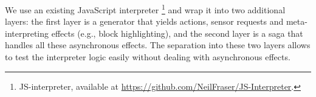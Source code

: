 We use an existing JavaScript interpreter%
\footnote{JS-interpreter, available at \url{https://github.com/NeilFraser/JS-Interpreter}.}
and wrap it into two
additional layers: the first layer is a generator
that yields actions, sensor requests and
meta-interpreting effects (e.g., block highlighting), %
and the second layer is a saga
that handles all these asynchronous effects.
The separation into these two layers allows to test the interpreter logic
easily without dealing with asynchronous effects.
